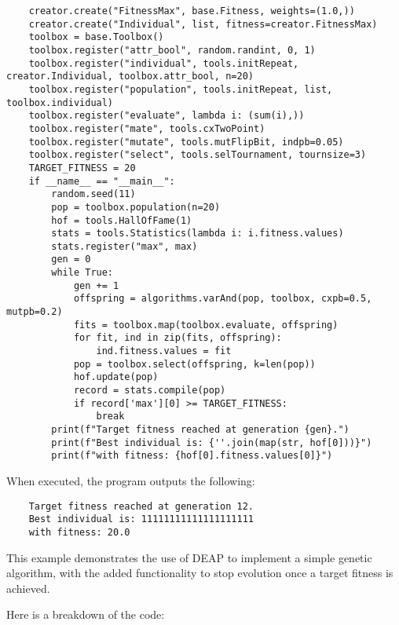   \begin{verbatim}
    creator.create("FitnessMax", base.Fitness, weights=(1.0,))
    creator.create("Individual", list, fitness=creator.FitnessMax)
    toolbox = base.Toolbox()
    toolbox.register("attr_bool", random.randint, 0, 1)
    toolbox.register("individual", tools.initRepeat, creator.Individual, toolbox.attr_bool, n=20)
    toolbox.register("population", tools.initRepeat, list, toolbox.individual)
    toolbox.register("evaluate", lambda i: (sum(i),))
    toolbox.register("mate", tools.cxTwoPoint)
    toolbox.register("mutate", tools.mutFlipBit, indpb=0.05)
    toolbox.register("select", tools.selTournament, tournsize=3)
    TARGET_FITNESS = 20
    if __name__ == "__main__":
        random.seed(11)
        pop = toolbox.population(n=20)
        hof = tools.HallOfFame(1)
        stats = tools.Statistics(lambda i: i.fitness.values)
        stats.register("max", max)
        gen = 0
        while True:
            gen += 1
            offspring = algorithms.varAnd(pop, toolbox, cxpb=0.5, mutpb=0.2)
            fits = toolbox.map(toolbox.evaluate, offspring)
            for fit, ind in zip(fits, offspring):
                ind.fitness.values = fit
            pop = toolbox.select(offspring, k=len(pop))
            hof.update(pop)
            record = stats.compile(pop)
            if record['max'][0] >= TARGET_FITNESS:
                break
        print(f"Target fitness reached at generation {gen}.")
        print(f"Best individual is: {''.join(map(str, hof[0]))}")
        print(f"with fitness: {hof[0].fitness.values[0]}")
  \end{verbatim}

  When executed, the program outputs the following:

  \begin{verbatim}
    Target fitness reached at generation 12.
    Best individual is: 11111111111111111111
    with fitness: 20.0
  \end{verbatim}

  This example demonstrates the use of DEAP to implement a simple genetic
  algorithm, with the added functionality to stop evolution once a target
  fitness is achieved.

  Here is a breakdown of the code:

